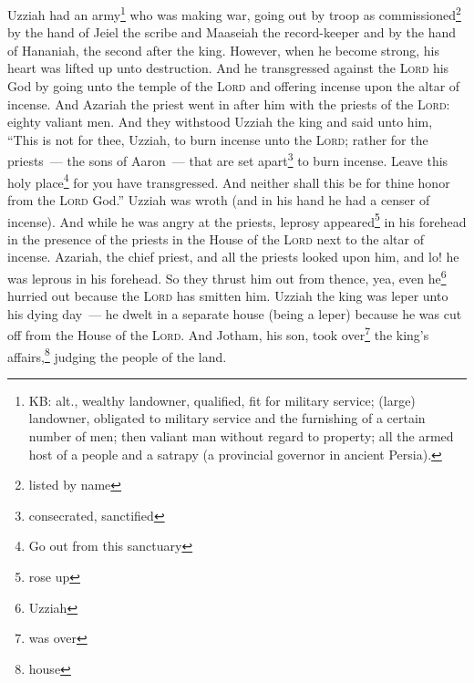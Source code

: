 \begin{inparaenum}
     Uzziah had an army\footnote{KB: alt., wealthy landowner, qualified, fit for military service; (large) landowner, obligated to military service and the furnishing of a certain number of men; then valiant man without regard to property; all the armed host of a people and a satrapy (a provincial governor in ancient Persia).} who was making war, going out by troop as commissioned\footnote{listed by name} by the hand of Jeiel the scribe and Maaseiah the record-keeper and by the hand of Hananiah, the second after the king.%
     However, when he become strong, his heart was lifted up unto destruction. And he transgressed against the \textsc{Lord} his God by going unto the temple of the \textsc{Lord} and offering incense upon the altar of incense.%
     And Azariah the priest went in after him with the priests of the \textsc{Lord}: eighty valiant men.%
     And they withstood Uzziah the king and said unto him, ``This is not for thee, Uzziah, to burn incense unto the \textsc{Lord}; rather for the priests~--- the sons of Aaron~--- that are set apart\footnote{consecrated, sanctified} to burn incense. Leave this holy place\footnote{Go out from this sanctuary} for you have transgressed. And neither shall this be for thine honor from the \textsc{Lord} God.''%
     Uzziah was wroth (and in his hand he had a censer of incense). And while he was angry at the priests, leprosy appeared\footnote{rose up} in his forehead in the presence of the priests in the House of the \textsc{Lord} next to the altar of incense.%
     Azariah, the chief priest, and all the priests looked upon him, and lo! he was leprous in his forehead. So they thrust him out from thence, yea, even he\footnote{Uzziah} hurried out because the \textsc{Lord} has smitten him.%
     Uzziah the king was leper unto his dying day~--- he dwelt in a separate house (being a leper) because he was cut off from the House of the \textsc{Lord}. And Jotham, his son, took over\footnote{was over} the king's affairs,\footnote{house} judging the people of the land.%
\end{inparaenum}
